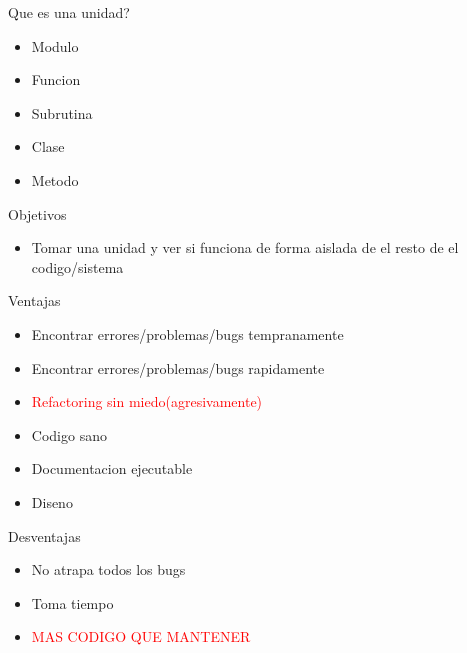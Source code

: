 \begin{frame}{Que es una unidad?}
    \begin{itemize}
        \item Modulo
        \item Funcion
        \item Subrutina
        \item Clase
        \item Metodo
    \end{itemize}
\end{frame}

\begin{frame}{Objetivos}
    \begin{itemize}
        \item Tomar una unidad y ver si funciona de forma aislada de el resto de el codigo/sistema
    \end{itemize}
\end{frame}

\begin{frame}{Ventajas}
    \begin{itemize}
        \item Encontrar errores/problemas/bugs tempranamente
        \item Encontrar errores/problemas/bugs rapidamente
        \item \textcolor{red}{Refactoring sin miedo(agresivamente)}
        \item Codigo sano
        \item Documentacion ejecutable
        \item Diseno
    \end{itemize}
\end{frame}

\begin{frame}{Desventajas}
    \begin{itemize}
        \item No atrapa todos los bugs
        \item Toma tiempo
        \item \textcolor{red}{MAS CODIGO QUE MANTENER}
    \end{itemize}
\end{frame}
